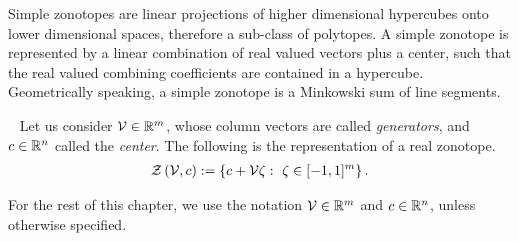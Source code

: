 Simple zonotopes are linear projections of higher dimensional
hypercubes onto lower dimensional spaces, therefore a sub-class of
polytopes.  A simple zonotope is represented by a linear combination
of real valued vectors plus a center, such that the real valued
combining coefficients are contained in a hypercube.  Geometrically
speaking, a simple zonotope is a Minkowski sum of line segments.
%
\begin{definition}~\label{defn:rztope}
Let us consider $\mathcal{V}\in\mathbb{R}^m$, whose column vectors are called
\emph{generators}, and $c\in\mathbb{R}^n$ called the \emph{center}.  The following is the
representation of a real zonotope.
%
\begin{align*}
\mathit{\mathcal{Z}}\left(\mathcal{V},c\right):=\left\{c+\mathcal{V}\zeta:~\zeta\in[-1,1]^m\right\}.
\end{align*}
%
\end{definition}
%
For the rest of this chapter, we
use the notation $\mathcal{V}\in\mathbb{R}^m$ and $c\in\mathbb{R}^n$, unless
otherwise specified.

